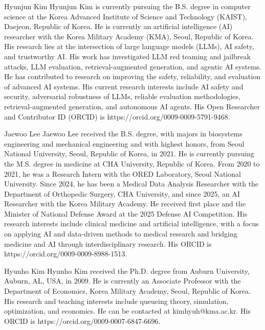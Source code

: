 \documentclass{ieeeaccess}
\begin{document}
\endgroup



\begin{IEEEbiographynophoto}{Hyunjun Kim}
Hyunjun Kim is currently pursuing the B.S. degree in computer science at the Korea Advanced Institute of Science and Technology (KAIST), Daejeon, Republic of Korea. He is currently an artificial intelligence (AI) researcher with the Korea Military Academy (KMA), Seoul, Republic of Korea. His research lies at the intersection of large language models (LLMs), AI safety, and trustworthy AI. His work has investigated LLM red teaming and jailbreak attacks, LLM evaluation, retrieval-augmented generation, and agentic AI systems. He has contributed to research on improving the safety, reliability, and evaluation of advanced AI systems. His current research interests include AI safety and security, adversarial robustness of LLMs, reliable evaluation methodologies, retrieval-augmented generation, and autonomous AI agents. His Open Researcher and Contributor ID (ORCID) is https://orcid.org/0009-0009-5791-9468.
\end{IEEEbiographynophoto}

\begin{IEEEbiographynophoto}{Jaewoo Lee}
Jaewoo Lee received the B.S. degree, with majors in biosystems engineering and mechanical engineering and with highest honors, from Seoul National University, Seoul, Republic of Korea, in 2021. He is currently pursuing the M.S. degree in medicine at CHA University, Republic of Korea. From 2020 to 2021, he was a Research Intern with the ORED Laboratory, Seoul National University. Since 2024, he has been a Medical Data Analysis Researcher with the Department of Orthopedic Surgery, CHA University, and since 2025, an AI Researcher with the Korea Military Academy. He received first place and the Minister of National Defense Award at the 2025 Defense AI Competition. His research interests include clinical medicine and artificial intelligence, with a focus on applying AI and data-driven methods to medical research and bridging medicine and AI through interdisciplinary research. His ORCID is https://orcid.org/0009-0009-8988-1513.
\end{IEEEbiographynophoto}

\begin{IEEEbiographynophoto}{Hyunho Kim}
Hyunho Kim received the Ph.D. degree from Auburn University, Auburn, AL, USA, in 2009. He is currently an Associate Professor with the Department of Economics, Korea Military Academy, Seoul, Republic of Korea. His research and teaching interests include queueing theory, simulation, optimization, and economics. He can be contacted at kimhyuh@kma.ac.kr. His ORCID is https://orcid.org/0009-0007-6847-6696.
\end{IEEEbiographynophoto}
\end{document}

